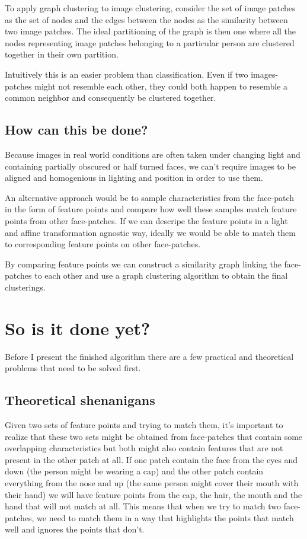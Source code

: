 \documentclass{article}
\begin{document}
To apply graph clustering to image clustering, consider the set of image 
patches as the set of nodes and the edges between the nodes as the similarity 
between two image patches. The ideal partitioning of the graph is then one 
where all the nodes representing image patches belonging to a particular person 
are clustered together in their own partition.

Intuitively this is an easier problem than classification. Even if two 
images-patches might not resemble each other, they could both happen to 
resemble a common neighbor and consequently be clustered together.

\subsection{How can this be done?}
Because images in real world conditions are often taken under changing light 
and containing partially obscured or half turned faces, we can't require images 
to be aligned and homogenious in lighting and position in order to use them.  

An alternative approach would be to sample characteristics from the face-patch 
in the form of feature points and compare how well these samples match feature 
points from other face-patches. If we can descripe the feature points in a 
light and affine transformation agnostic way, ideally we would be able to match 
them to corresponding feature points on other face-patches.

By comparing feature points we can construct a similarity graph linking the 
face-patches to each other and use a graph clustering algorithm to obtain the 
final clusterings.

\section{So is it done yet?}
Before I present the finished algorithm there are a few practical and 
theoretical problems that need to be solved first.

\subsection{Theoretical shenanigans}

Given two sets of feature points and trying to match them, it's important to 
realize that these two sets might be obtained from face-patches that contain 
some overlapping characteristics but both might also contain features that are 
not present in the other patch at all. If one patch contain the face from the 
eyes and down (the person might be wearing a cap) and the other patch contain 
everything from the nose and up (the same person might cover their mouth with 
their hand) we will have feature points from the cap, the hair, the mouth and 
the hand that will not match at all. This means that when we try to match two 
face-patches, we need to match them in a way that highlights the points that 
match well and ignores the points that don't.
\end{document}

